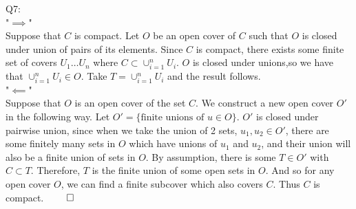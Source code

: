 \documentclass[letterpaper]{article}
\begin{document}
Q7: 
\\
"$\implies$"
\\ Suppose that $C$ is compact. Let $O$ be an open cover of $C$ such that $O$ is closed under union of pairs of its elements. Since $C$ is compact, there exists some finite set of covers $U_1 \dots U_n$ where $C \subset \cup_{i=1}^n U_i$. $O$ is closed under unions,so we have that $\cup_{i=1}^n U_i \in O$. 
Take $T = \cup_{i=1}^n U_i$ and the result follows. 
\\ 
"$\impliedby$"
\\
Suppose that $O$ is an open cover of the set $C$. We construct a new open cover $O'$ in the following way. Let $O' = \{ \text{finite unions of } u \in O\}$. $O'$ is closed under pairwise union, since when we take the union of 2 sets, $u_1,u_2 \in O'$, there are some finitely many sets in $O$ which have unions of $u_1$ and $u_2$, and their union will also be a finite union of sets in $O$. By assumption, there is some $T \in O'$ with $C\subset T$. Therefore, $T$ is the finite union of some open sets in $O$. And so for any open cover $O$, we can find a finite subcover which also covers $C$. Thus $C$ is compact. $\qed$
\end{document}
